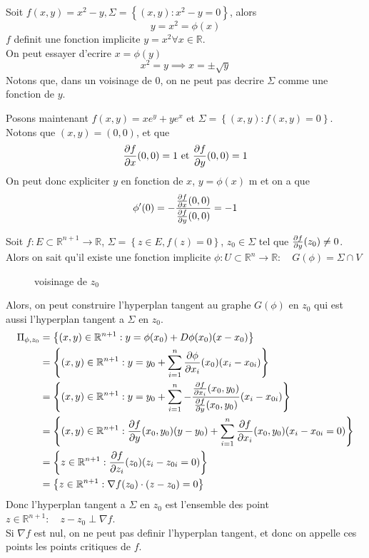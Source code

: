\documentclass[../main.tex]{subfiles}
\begin{document}
\begin{exemple}
	Soit $f( x,y) = x^{2}-y, \Sigma = \left\{ ( x,y) : x^{2}-y= 0 \right\} $, alors
\[ 
	y= x^{2}= \phi( x) 
\]
$f$ definit une fonction implicite $y=x^{2}\forall x \in \mathbb{R}$.\\
On peut essayer d'ecrire $x= \phi( y) $ 
\[ 
	x^{2}= y \implies x= \pm \sqrt{y} 
\]
Notons que, dans un voisinage de $0$, on ne peut pas decrire $\Sigma$ comme une fonction de $y$.\\
\end{exemple}
\begin{exemple}
	Posons maintenant $f( x,y) =x e^{y} + y e^{x} $ et $\Sigma= \left\{ ( x,y) : f( x,y) =0 \right\} $.\\
	Notons que $( x,y) = ( 0,0) $, et que
	\[ 
		\frac{\partial f}{\partial x}( 0,0) = 1 \text{ et } \frac{\partial f}{\partial y}( 0,0) =1
	\]
	On peut donc expliciter $y$ en fonction de $x$, $y= \phi( x) $ m et on a que
\[ 
	\phi'( 0) = - \frac{ \frac{\partial f}{\partial x}( 0,0) }{ \frac{\partial f}{\partial y}( 0,0) }=-1
\]

\end{exemple}
Soit $f: E \subset \mathbb{R}^{n+1} \to \mathbb{R}$, $\Sigma = \left\{ z \in E, f( z) = 0 \right\} $, $z_0 \in \Sigma$ tel que $ \frac{\partial f}{\partial y}( z_0) \neq 0$.\\
Alors on sait qu'il existe une fonction implicite $\phi: U \subset \mathbb{R}^n\to \mathbb{R}: \quad G( \phi) = \Sigma \cap V$

\begin{figure}[H]
    \centering
    \caption{voisinage de $z_0$}
    \label{fig:voisinage-de-z0}
\end{figure}
Alors, on peut construire l'hyperplan tangent au graphe $G( \phi) $ en $z_0$ qui est aussi l'hyperplan tangent a $\Sigma$ en $z_0$.
\begin{align*}
	\Pi_{\phi,z_0} &= \left\{ ( x,y) \in \mathbb{R}^{n+1}: y = \phi( x_0) + D\phi( x_0) ( x-x_0)  \right\} \\
		       &= \left\{ ( x,y) \in \mathbb{R}^{n+1}: y = y_0 + \sum_{i=1}^{ n} \frac{\partial \phi}{\partial x_i}( x_0) ( x_i - x_{0i} )  \right\} \\
		       &= \left\{ ( x,y) \in \mathbb{R}^{n+1}: y = y_0 + \sum_{i=1}^{ n} - \frac{ \frac{\partial f}{\partial x_i}( x_0,y_0) }{\frac{ \partial f}{\partial y}( x_0,y_0) }( x_i - x_{0i} )  \right\} \\
		       &= \left\{  ( x,y ) \in \mathbb{R}^{n+1}: \frac{\partial f}{\partial y}( x_0,y_0) ( y-y_0) + \sum_{i=1 }^{ n} \frac{\partial f}{\partial x_i}( x_0,y_0) ( x_i - x_{0i} = 0)  \right\} \\
		       &= \left\{ z \in \mathbb{R}^{n+1}: \frac{\partial f}{\partial z_{i} } ( z_0) ( z_i - z_{0i}  = 0)  \right\} \\
		       &= \left\{ z \in \mathbb{R}^{n+1}: \nabla f( z_0)\cdot (z-z_0) = 0  \right\} 
\end{align*}
Donc l'hyperplan tangent a $\Sigma$ en $z_0$ est l'ensemble des point $z \in \mathbb{R}^{n+1}: \quad z-z_0 \perp \nabla f$.\\
Si $\nabla f$ est nul, on ne peut pas definir l'hyperplan tangent, et donc on appelle ces points les points critiques de $f$.



					

		
\end{document}
